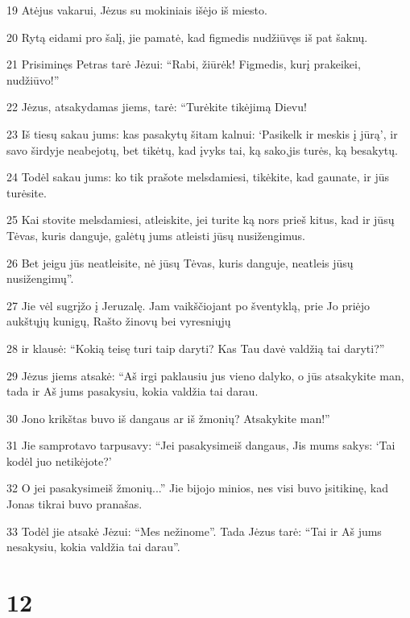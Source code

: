 \par 19 Atėjus vakarui, Jėzus su mokiniais išėjo iš miesto. 
\par 20 Rytą eidami pro šalį, jie pamatė, kad figmedis nudžiūvęs iš pat šaknų. 
\par 21 Prisiminęs Petras tarė Jėzui: “Rabi, žiūrėk! Figmedis, kurį prakeikei, nudžiūvo!” 
\par 22 Jėzus, atsakydamas jiems, tarė: “Turėkite tikėjimą Dievu! 
\par 23 Iš tiesų sakau jums: kas pasakytų šitam kalnui: ‘Pasikelk ir meskis į jūrą’, ir savo širdyje neabejotų, bet tikėtų, kad įvyks tai, ką sako,­jis turės, ką besakytų. 
\par 24 Todėl sakau jums: ko tik prašote melsdamiesi, tikėkite, kad gaunate, ir jūs turėsite. 
\par 25 Kai stovite melsdamiesi, atleiskite, jei turite ką nors prieš kitus, kad ir jūsų Tėvas, kuris danguje, galėtų jums atleisti jūsų nusižengimus. 
\par 26 Bet jeigu jūs neatleisite, nė jūsų Tėvas, kuris danguje, neatleis jūsų nusižengimų”. 
\par 27 Jie vėl sugrįžo į Jeruzalę. Jam vaikščiojant po šventyklą, prie Jo priėjo aukštųjų kunigų, Rašto žinovų bei vyresniųjų 
\par 28 ir klausė: “Kokią teisę turi taip daryti? Kas Tau davė valdžią tai daryti?” 
\par 29 Jėzus jiems atsakė: “Aš irgi paklausiu jus vieno dalyko, o jūs atsakykite man, tada ir Aš jums pasakysiu, kokia valdžia tai darau. 
\par 30 Jono krikštas buvo iš dangaus ar iš žmonių? Atsakykite man!” 
\par 31 Jie samprotavo tarpusavy: “Jei pasakysime­iš dangaus, Jis mums sakys: ‘Tai kodėl juo netikėjote?’ 
\par 32 O jei pasakysime­iš žmonių...” Jie bijojo minios, nes visi buvo įsitikinę, kad Jonas tikrai buvo pranašas. 
\par 33 Todėl jie atsakė Jėzui: “Mes nežinome”. Tada Jėzus tarė: “Tai ir Aš jums nesakysiu, kokia valdžia tai darau”.



\chapter{12}


